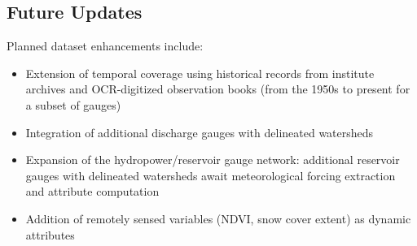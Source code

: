 \subsection{Future Updates}
Planned dataset enhancements include:
\begin{itemize}
    \item Extension of temporal coverage using historical records from institute archives and OCR-digitized observation books (from the 1950s to present for a subset of gauges)
    \item Integration of additional discharge gauges with delineated watersheds
    \item Expansion of the hydropower/reservoir gauge network: additional reservoir gauges with delineated watersheds await meteorological forcing extraction and attribute computation
    \item Addition of remotely sensed variables (NDVI, snow cover extent) as dynamic attributes
\end{itemize}
